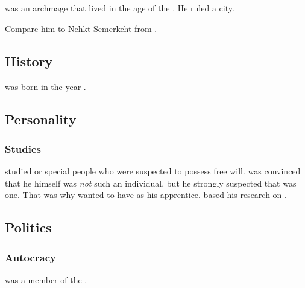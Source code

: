 \section{\ZeethanKraal}
\index{\ZeethanKraal}
\ZeethanKraal was an \ophidian archmage that lived in the age of the \thirdbanewar. 
He ruled a city. 

Compare him to Nehkt Semerkeht from \cite{RobertEHoward:NehktSemerkeht}. 









\subsection{History}
\ZeethanKraal was born in the year .









\subsection{Personality}





\subsubsection{Studies}
\Kraal studied  or \dash special people who were suspected to possess free will. 
\Kraal was convinced that he himself was \emph{not} such an individual, but he strongly suspected that \CarzainShachar was one. 
That was why \Kraal wanted to have \Shachar as his apprentice. 
\Kraal based his research on . 









\subsection{Politics}





\subsubsection{\Caisith Autocracy}
\Kraal was a member of the . 






